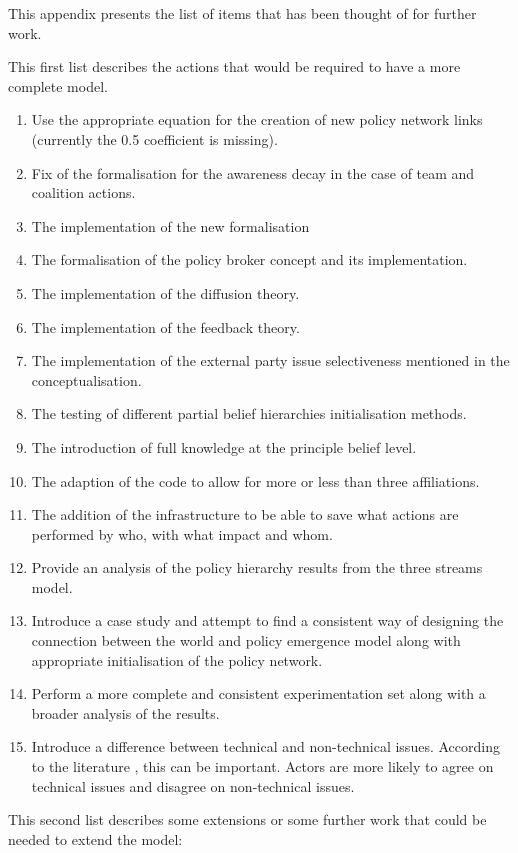 This appendix presents the list of items that has been thought of for further work.

This first list describes the actions that would be required to have a more complete model.

\begin{enumerate}
\item Use the appropriate equation for the creation of new policy network links (currently the 0.5 coefficient is missing).
\item Fix of the formalisation for the awareness decay in the case of team and coalition actions.
\item The implementation of the new formalisation
\item The formalisation of the policy broker concept and its implementation.
\item The implementation of the diffusion theory.
\item The implementation of the feedback theory.
\item The implementation of the external party issue selectiveness mentioned in the conceptualisation.
\item The testing of different partial belief hierarchies initialisation methods.
\item The introduction of full knowledge at the principle belief level.
\item The adaption of the code to allow for more or less than three affiliations.
\item The addition of the infrastructure to be able to save what actions are performed by who, with what impact and whom.
\item Provide an analysis of the policy hierarchy results from the three streams model.
\item Introduce a case study and attempt to find a consistent way of designing the connection between the world and policy emergence model along with appropriate initialisation of the policy network.
\item Perform a more complete and consistent experimentation set along with a broader analysis of the results.
\item Introduce a difference between technical and non-technical issues. According to the literature \citep{nohrstedt2010logic}, this can be important. Actors are more likely to agree on technical issues and disagree on non-technical issues.
\end{enumerate}

This second list describes some extensions or some further work that could be needed to extend the model:

